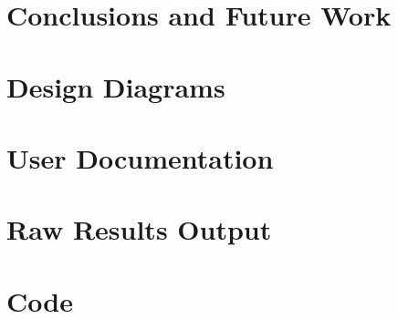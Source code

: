 \documentclass[12pt,a4paper]{report}
\begin{document}
\chapter{Conclusions and Future Work}






\appendix


\chapter{Design Diagrams}

\chapter{User Documentation}

\chapter{Raw Results Output}

\chapter{Code}
\end{document}
